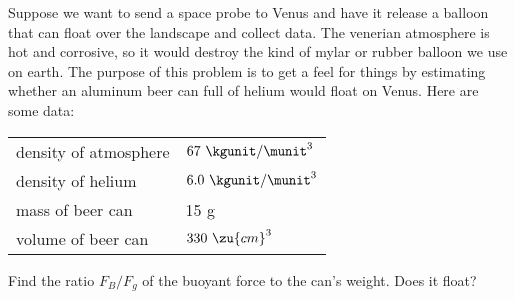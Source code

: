 Suppose we want to send a space probe to Venus and have it
release a balloon that can float over the landscape and collect
data. The venerian atmosphere is hot and corrosive, so it would
destroy the kind of mylar or rubber balloon we use on earth.
The purpose of this problem is to get a feel for things by estimating whether an aluminum beer
can full of helium would float on Venus. Here are some data:

\noindent\begin{tabular}{p{40mm}l}
density of atmosphere & $67\ \kgunit/\munit^3$ \\
density of helium & $6.0\ \kgunit/\munit^3$ \\
mass of beer can & 15 g \\
volume of beer can & $330\ \zu{cm}^3$
\end{tabular}

\noindent Find the ratio $F_B/F_g$ of the buoyant force to the can's weight. Does it float?\answercheck\hwendpart

